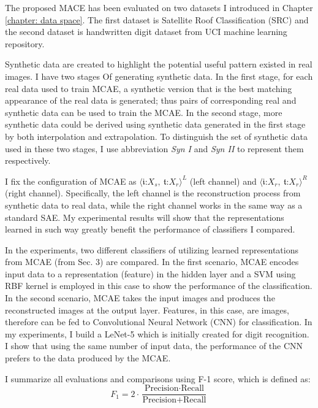 \documentclass{iitthesis}
\begin{document}

The proposed MACE has been evaluated on two datasets I introduced in Chapter \ref{chapter: data space}. The first dataset is Satellite Roof Classification (SRC) and the second dataset is handwritten digit dataset from UCI machine learning repository.

Synthetic data are created to highlight the potential useful pattern existed in real images. I have two stages
Of generating synthetic data. In the first stage, for each real data used to train MCAE, a synthetic version that is the best matching appearance of the real data is generated; thus pairs of corresponding real and synthetic data can be used to train the MCAE. In the second stage, more synthetic data could be derived using synthetic data generated in the first stage by both interpolation and extrapolation. To distinguish the set of synthetic data used in these two stages, I use abbreviation \textit{Syn I} and \textit{Syn II} to represent them respectively.

 I fix the configuration of MCAE as $\langle\mathfrak{i}\text{:}X_{s},\:\mathfrak{t}\text{:}X_{r}\rangle^{L}$
(left channel) and $\langle\mathfrak{i}\text{:}X_{r},\:\mathfrak{t}\text{:}X_{r}\rangle^{R}$
(right channel). Specifically, the left channel is the reconstruction process from synthetic data to real data,
while the right channel works in the same way as a standard SAE. My experimental results will show that the representations learned in such way greatly benefit the performance of classifiers I compared.

In the experiments, two different classifiers of utilizing learned representations from MCAE (from Sec. 3) are compared. In the first scenario, MCAE encodes input data to a representation (feature) in the hidden layer and a
SVM using RBF kernel is employed in this case to show the performance of the classification. In the second scenario, MCAE takes the input images and produces the reconstructed images at the output layer. Features, in this case, are images, therefore can be fed to Convolutional Neural Network (CNN) for classification. In my experiments, I build a LeNet-5 \cite{LY:98} which is initially created for digit recognition. I show that using the same number of input data, the performance of the CNN prefers to the data produced by the MCAE.

I summarize all evaluations and comparisons using F-1 score, which
is defined as: 
\begin{equation}
F_{1}=2\cdot\frac{\text{Precision}\cdot\text{Recall}}{\text{Precision}+\text{Recall}}
\end{equation}
\end{document}
